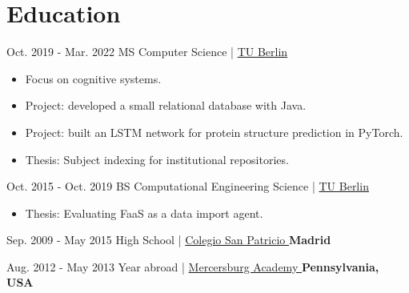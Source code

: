 \documentclass[]{commands}
\begin{document}
\section{Education}
\begin{entrylist}
 
   \entry
    {Oct. 2019 - Mar. 2022}
    {MS Computer Science | }
    { \href{https://www.tu.berlin/en/}{\small TU Berlin \faMousePointer}}
    {}
    {\jobspace
    \begin{itemize}[leftmargin=*, itemsep = 0.1em]
        \item Focus on cognitive systems.
        \item Project: developed a small relational database with Java.
        \item Project: built an LSTM network for protein structure prediction in PyTorch.
        \item Thesis: Subject indexing for institutional repositories.\\
    \end{itemize}}
    
  \entry
    {Oct. 2015 - Oct. 2019}
    {BS Computational Engineering Science | }
    { \href{https://www.tu.berlin/en/}{\small TU Berlin \faMousePointer}}
    {}
    {\jobspace
    \begin{itemize}[leftmargin=*, itemsep = 0.1em]
        \item Thesis: Evaluating FaaS as a data import agent.\\
    \end{itemize}}

  \entry
    {Sep. 2009 - May 2015}
    {High School | }
    { \href{https://colegiosanpatriciomadrid.com/en}{\small Colegio San Patricio \faMousePointer}}    {\normalsize\textbf{\color{ipsgreen}\faMapMarker\space Madrid}}
    {}
    
  \entry
    {Aug. 2012 - May 2013}
    {Year abroad | }
    { \href{https://www.mercersburg.edu/}{\small Mercersburg Academy \faMousePointer}}    {\normalsize\textbf{\color{ipsgreen}\faMapMarker\space Pennsylvania, USA}}
    {}
\end{entrylist}

\end{document}
